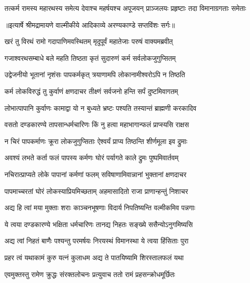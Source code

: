 \fourlineindentedshloka
{तत्कर्म रामस्य महारथस्य}
{समेत्य देवाश्च महर्षयश्च}
{अपूजयन् प्राञ्जलयः प्रहृष्टाः}
{तदा विमानाग्रगताः समेताः} %


{॥इत्यार्षे श्रीमद्रामायणे वाल्मीकीये आदिकाव्ये अरण्यकाण्डे सप्तविंशः सर्गः॥}


\twolineshloka
{खरं तु विरथं रामो गदापाणिमवस्थितम्}
{मृदुपूर्वं महातेजाः परुषं वाक्यमब्रवीत्} %

\twolineshloka
{गजाश्वरथसम्बाधे बले महति तिष्ठता}
{कृतं सुदारुणं कर्म सर्वलोकजुगुप्सितम्} %

\twolineshloka
{उद्वेजनीयो भूतानां नृशंसः पापकर्मकृत्}
{त्रयाणामपि लोकानामीश्वरोऽपि न तिष्ठति} %

\twolineshloka
{कर्म लोकविरुद्धं तु कुर्वाणं क्षणदाचर}
{तीक्ष्णं सर्वजनो हन्ति सर्पं दुष्टमिवागतम्} %

\twolineshloka
{लोभात्पापानि कुर्वाणः कामाद्वा यो न बुध्यते}
{भ्रष्टः पश्यति तस्यान्तं ब्राह्मणी करकादिव} %

\twolineshloka
{वसतो दण्डकारण्ये तापसान्धर्मचारिणः}
{किं नु हत्वा महाभागान्फलं प्राप्स्यसि राक्षस} %

\twolineshloka
{न चिरं पापकर्माणः क्रूरा लोकजुगुप्सिताः}
{ऐश्वर्यं प्राप्य तिष्ठन्ति शीर्णमूला इव द्रुमाः} %

\twolineshloka
{अवश्यं लभते कर्ता फलं पापस्य कर्मणः}
{घोरं पर्यागते काले द्रुमः पुष्पमिवार्तवम्} %

\twolineshloka
{नचिरात्प्राप्यते लोके पापानां कर्मणां फलम्}
{सविषाणामिवान्नानां भुक्तानां क्षणदाचर} %

\twolineshloka
{पापमाच्चरतां घोरं लोकस्याप्रियमिच्छताम्}
{अहमासादितो राजा प्राणान्हन्तुं निशाचर} %

\twolineshloka
{अद्य हि त्वां मया मुक्ताः शराः काञ्चनभूषणाः}
{विदार्य निपतिष्यन्ति वल्मीकमिव पन्नगाः} %

\twolineshloka
{ये त्वया दण्डकारण्ये भक्षिता धर्मचारिणः}
{तानद्य निहतः सङ्ख्ये ससैन्योऽनुगमिष्यसि} %

\twolineshloka
{अद्य त्वां निहतं बाणैः पश्यन्तु परमर्षयः}
{निरयस्थं विमानस्था ये त्वया हिंसिताः पुरा} %

\twolineshloka
{प्रहर त्वं यथाकामं कुरु यत्नं कुलाधम}
{अद्य ते पातयिष्यामि शिरस्तालफलं यथा} %

\twolineshloka
{एवमुक्तस्तु रामेण क्रुद्धः संरक्तलोचनः}
{प्रत्युवाच ततो रामं प्रहसन्क्रोधमूर्छितः} %

